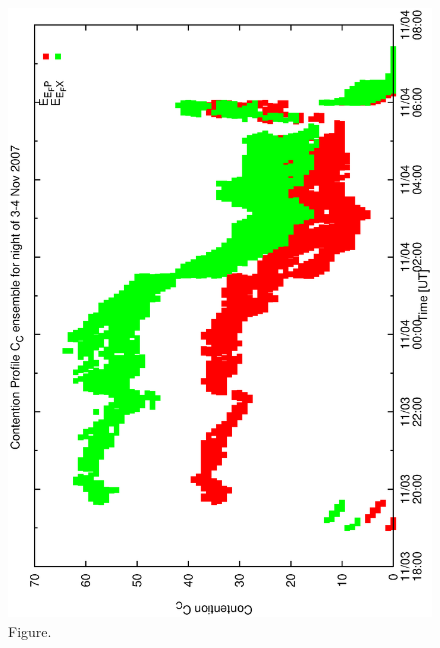 \documentclass[12pt,a4paper]{article}
\begin{document}
\begin{figure}[htbp]
 \begin{center}
  \includegraphics[scale=1.0, angle=0]{figures/dwsfix4b_ensemble.eps}
 \end{center}
  \caption[Figure.]
{Figure.}
\end{figure}
\clearpage
\end{document}
